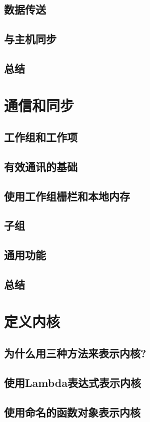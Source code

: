 \documentclass[11pt,a4paper,UTF8]{ctexart}
\begin{document}
		\subsection{数据传送}
		\subsection{与主机同步}
		\subsection{总结}
	\section{通信和同步}
		\subsection{工作组和工作项}
		\subsection{有效通讯的基础}
		\subsection{使用工作组栅栏和本地内存}
		\subsection{子组}
		\subsection{通用功能}
		\subsection{总结}
	\section{定义内核}
		\subsection{为什么用三种方法来表示内核?}
		\subsection{使用Lambda表达式表示内核}
		\subsection{使用命名的函数对象表示内核}
\end{document}
